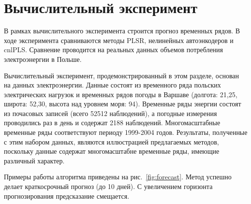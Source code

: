 \documentclass[12pt,twoside]{article}
\begin{document}
\newpage
\section{Вычислительный эксперимент}
В рамках вычислительного эксперимента строится прогноз временных рядов. В ходе эксперимента сравниваются методы PLSR, нелинейных автоэнкодеров и cnlPLS. Сравнение проводится на реальных данных объемов потребления электроэнергии в Польше. 

Вычислительный эксперимент, продемонстрированный в этом разделе, основан на данных электроэнергии. Данные состоят из временного ряда польских электрических нагрузок и временных рядов погоды в Варшаве (долгота: 21,25, широта: 52,30, высота над уровнем моря: 94). Временные ряды энергии состоят из почасовых записей (всего 52512 наблюдений), а погодные измерения проводились раз в день и содержат 2188 наблюдений. Многомасштабные временные ряды соответствуют периоду 1999-2004 годов. Результаты, полученные с этим набором данных, являются иллюстрацией предлагаемых методов, поскольку данные содержат многомасштабне временные ряды, имеющие различный характер.

Примеры работы алгоритма приведены на рис.~\ref{fig:forecast}. Метод успешно делает краткосрочный прогноз (до 10 дней). С увеличением горизонта прогнозирования предсказание смещается. 



\end{document}

